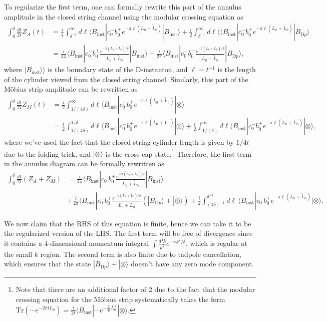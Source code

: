 \documentclass[12pt]{article}
\newcommand{\ie}{\begin{equation}\begin{aligned}}
\newcommand{\fe}{\end{aligned}\end{equation}}
\begin{document}
To regularize the first term,  one can formally rewrite this part of the annulus amplitude in the closed string channel using the modular crossing equation as
\ie
\int_0^\delta \frac{dt}{2t}Z_A(t)&=\frac{i}{4}\int_{\delta^{-1}}^\infty d\ell \langle  B_\text{inst} | c_0^- b_0^+ e^{-\pi \ell(L_0+\tilde{L}_0)}|B_\text{inst} \rangle  + \frac{i}{2}\int_{\delta^{-1}}^\infty d\ell \langle \langle B_\text{inst} | c_0^- b_0^+ e^{-\pi \ell(L_0+\tilde{L}_0)}|B_{\text{D}p} \rangle \\
&=\frac{i}{4\pi}\langle  B_\text{inst} | c_0^- b_0^+ \frac{e^{-\pi(L_0+\tilde{L}_0)/\delta}}{L_0+\tilde{L}_0}|B_\text{inst} \rangle + \frac{i}{2\pi}\langle B_\text{inst} | c_0^- b_0^+ \frac{e^{-\pi(L_0+\tilde{L}_0)/\delta}}{L_0+\tilde{L}_0}|B_{\text{D}p} \rangle,
\fe
where $|B_\text{inst}\rangle \rangle$ is the boundary state of the D-instanton, and $\ell=t^{-1}$ is the length of the cylinder viewed from the closed string channel. Similarly, this part of the M\"obius strip amplitude can be rewritten as
\ie
\int_0^\delta \frac{dt}{2t}Z_M(t)&=\frac{i}{2}\int_{1/(4\delta)}^\infty d\ell \langle B_\text{inst} | c_0^- b_0^+ e^{-\pi \ell(L_0+\tilde{L}_0)}|\otimes \rangle\\
&=\frac{i}{2}\int_{1/(4\delta)}^{1/\delta} d\ell \langle B_\text{inst} | c_0^- b_0^+ e^{-\pi \ell(L_0+\tilde{L}_0)}|\otimes \rangle + \frac{i}{2} \int_{1/(\delta)}^{\infty} d\ell  \langle B_\text{inst} | c_0^- b_0^+ e^{-\pi \ell(L_0+\tilde{L}_0)}|\otimes \rangle,
\fe
where we've used the fact that the closed string cylinder length is given by $1/4t$ due to the folding trick, and $|\otimes \rangle$ is the cross-cap state.\footnote{Note that there are an additional factor of 2 due to the fact that the modular crossing equation for the M\"obius strip systematically takes the form $\mathrm{Tr}(\cdots e^{-2\pi t L_0})=\frac{i}{2t}\langle B_\text{inst} |\cdots e^{-\frac{\pi}{4t}L_0^+}|\otimes \rangle$.} Therefore, the first term in the annulus diagram can be formally rewritten as
\ie
\int_0^\delta\frac{dt}{2t}(Z_A+Z_M)&= \frac{i}{4\pi} \langle B_\text{inst} | c_0^- b_0^+ \frac{e^{-\pi(L_0+\tilde{L}_0)/\delta}}{L_0+\tilde{L}_0}|B_\text{inst} \rangle  \\
&+ \frac{i}{2\pi}\langle B_\text{inst} | c_0^- b_0^+ \frac{e^{-\pi(L_0+\tilde{L}_0)/\delta}}{L_0+\tilde{L}_0}(|B_{\text{D}p} \rangle + |\otimes \rangle) + \frac{i}{2}\int_{(4\delta)^{-1}}^{\delta^{-1}}d\ell\,\langle B_\text{inst} | c_0^- b_0^+ e^{-\pi \ell(L_0+\tilde{L}_0)}|\otimes \rangle.
\fe

We now claim that the RHS of this equation is finite, hence we can take it to be the regularized version of the LHS. The first term will be free of divergence since it contains a 4-dimensional momentum integral $\int \frac{d^4k}{k^{2}} e^{-\pi k^2/\delta}$, which is regular at the small $k$ region. The second term is also finite due to tadpole cancellation, which ensures that the state $|B_{\text{D}p}\rangle + |\otimes \rangle$ doesn't have any zero mode component. 
\end{document}
